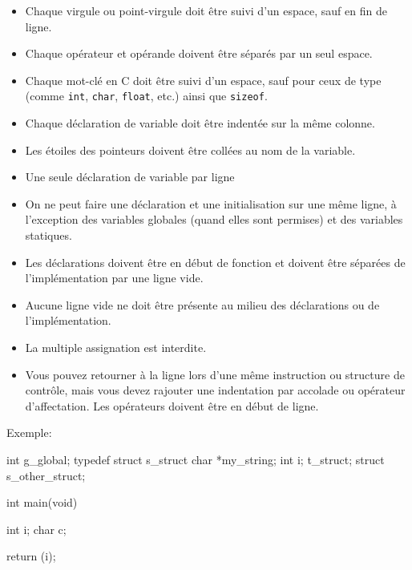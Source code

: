 \documentclass{42-fr}
\begin{document}
\begin{itemize}
                \item Chaque virgule ou point-virgule doit être suivi d’un espace, sauf en fin de ligne.

                \item Chaque opérateur et opérande doivent être séparés par un seul espace.

                \item Chaque mot-clé en C doit être suivi d’un espace, sauf pour ceux
                    de type (comme \texttt{int}, \texttt{char}, \texttt{float}, etc.) ainsi que \texttt{sizeof}.

                \item Chaque déclaration de variable doit être indentée sur la même colonne.

                \item Les étoiles des pointeurs doivent être collées au nom de la variable.

                \item Une seule déclaration de variable par ligne

                \item On ne peut faire une déclaration et une initialisation sur une même ligne,
                    à l’exception des variables globales (quand elles sont permises) et des variables statiques.

                \item Les déclarations doivent être en début de fonction et doivent être séparées 
                    de l’implémentation par une ligne vide.

                \item Aucune ligne vide ne doit être présente au milieu des déclarations ou de l’implémentation.

                \item La multiple assignation est interdite.

                \item Vous pouvez retourner à la ligne lors d’une même instruction ou structure de
                    contrôle, mais vous devez rajouter une indentation par accolade ou opérateur
                    d’affectation. Les opérateurs doivent être en début de ligne.
            \end{itemize}

            \newpage

            Exemple:
            \begin{42ccode}
int             g_global;
typedef struct  s_struct
{
    char    *my_string;
    int     i;
}               t_struct;
struct          s_other_struct;

int     main(void)
{
    int     i;
    char    c;

    return (i);
}
            \end{42ccode}
            \newpage
\end{document}
